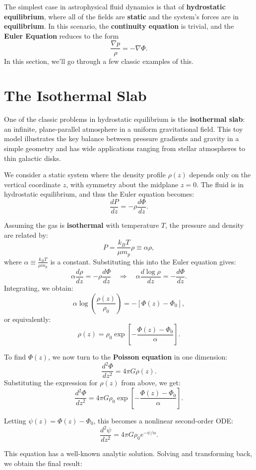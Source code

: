 The simplest case in astrophysical fluid dynamics is that of \textbf{hydrostatic equilibrium}, where all of the fields are \textbf{static} and the system's forces are in \textbf{equilibrium}. In this scenario, the \textbf{continuity equation} is trivial, and the \textbf{Euler Equation} reduces to the form
\[
\frac{\nabla p}{\rho} = -\nabla \Phi.
\]
In this section, we'll go through a few classic examples of this.

\section{The Isothermal Slab}

One of the classic problems in hydrostatic equilibrium is the \textbf{isothermal slab}: an infinite, plane-parallel atmosphere in a uniform gravitational field. This toy model illustrates the key balance between pressure gradients and gravity in a simple geometry and has wide applications ranging from stellar atmospheres to thin galactic disks.

We consider a static system where the density profile \( \rho(z) \) depends only on the vertical coordinate \( z \), with symmetry about the midplane \( z = 0 \). The fluid is in hydrostatic equilibrium, and thus the Euler equation becomes:
\[
\frac{dP}{dz} = - \rho \frac{d\Phi}{dz}.
\]

Assuming the gas is \textbf{isothermal} with temperature \( T \), the pressure and density are related by:
\[
P = \frac{k_B T}{\mu m_p} \rho \equiv \alpha \rho,
\]
where \( \alpha \equiv \frac{k_B T}{\mu m_p} \) is a constant. Substituting this into the Euler equation gives:
\[
\alpha \frac{d\rho}{dz} = -\rho \frac{d\Phi}{dz} \quad \Rightarrow \quad \alpha \frac{d\log \rho}{dz} = -\frac{d\Phi}{dz}.
\]
Integrating, we obtain:
\[
\alpha \log \left( \frac{\rho(z)}{\rho_0} \right) = -\left[ \Phi(z) - \Phi_0 \right],
\]
or equivalently:
\[
\boxed{
\rho(z) = \rho_0 \exp\left[-\frac{\Phi(z) - \Phi_0}{\alpha}\right].
}
\]

To find \( \Phi(z) \), we now turn to the \textbf{Poisson equation} in one dimension:
\[
\frac{d^2 \Phi}{dz^2} = 4\pi G \rho(z).
\]
Substituting the expression for \( \rho(z) \) from above, we get:
\[
\frac{d^2 \Phi}{dz^2} = 4\pi G \rho_0 \exp\left[-\frac{\Phi(z) - \Phi_0}{\alpha}\right].
\]

Letting \( \psi(z) = \Phi(z) - \Phi_0 \), this becomes a nonlinear second-order ODE:
\[
\frac{d^2 \psi}{dz^2} = 4\pi G \rho_0 e^{-\psi/\alpha}.
\]

This equation has a well-known analytic solution. Solving and transforming back, we obtain the final result:

